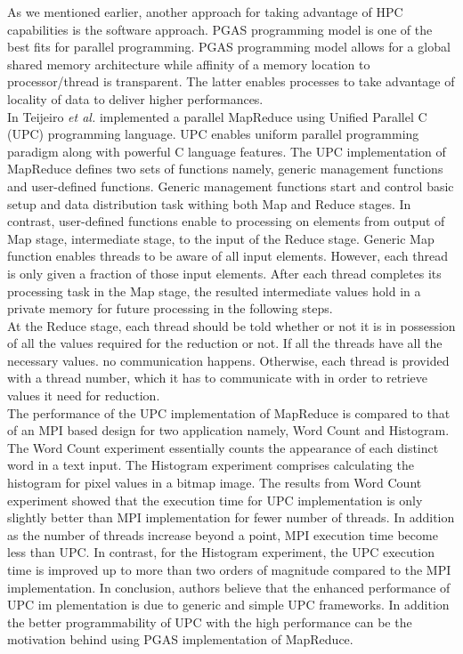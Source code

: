 \documentclass[runningheads,a4paper]{llncs}
\begin{document}
{As we mentioned earlier, another approach for taking advantage of HPC capabilities is the software approach. PGAS programming model is one of the best fits for parallel programming. PGAS programming model allows for a global shared memory architecture while affinity of a memory location to processor/thread is transparent. The latter enables processes to take advantage of locality of data to deliver higher performances.\\

In \cite{teijeiro2011design} Teijeiro \textit{et al.} implemented a parallel MapReduce using Unified Parallel C (UPC) \cite{el2006upc} programming language. UPC enables uniform parallel programming paradigm along with powerful C language features. The UPC implementation of MapReduce defines two sets of functions namely, generic management functions and user-defined functions. Generic management functions start and control basic setup and data distribution task withing both Map and Reduce stages. In contrast, user-defined functions enable to processing on elements from output of Map stage, intermediate stage, to the input of the Reduce stage. Generic Map function enables threads to be aware of all input elements. However, each thread is only given a fraction of those input elements. After each thread completes its processing task in the Map stage, the resulted intermediate values hold in a private memory for future processing in the following steps.\\

At the Reduce stage, each thread should be told whether or not it is in possession of all the values required for the reduction or not. If all the threads have all the necessary values. no communication happens. Otherwise, each thread is provided with a thread number, which it has to communicate with in order to retrieve values it need for reduction.\\

The performance of the UPC implementation of MapReduce is compared to that of an MPI based design for two application namely, Word Count and Histogram. The Word Count experiment essentially counts the appearance of each distinct word in a text input. The Histogram experiment comprises calculating the histogram for pixel values in a bitmap image. The results from Word Count experiment showed that the execution time for UPC implementation is only slightly better than MPI implementation for fewer number of threads. In addition as the number of threads increase beyond a point, MPI execution time become less than UPC. In contrast, for the Histogram experiment, the UPC execution time is improved up to more than two orders of magnitude compared to the MPI implementation. In conclusion, authors believe that the enhanced performance of UPC im	plementation is due to  generic and simple UPC frameworks. In addition the better programmability of UPC with the high performance can be the motivation behind using PGAS implementation of MapReduce. 



}
\end{document}
